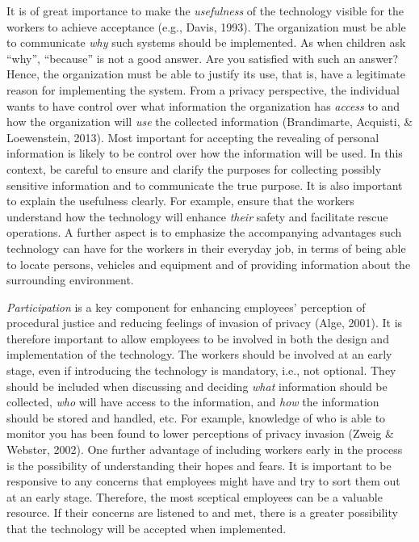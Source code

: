 \documentclass[
  12pt,
]{scrbook}
\begin{document}
It is of great importance to make the \emph{usefulness} of the technology visible for the workers to achieve acceptance (e.g., Davis, 1993). The organization must be able to communicate \emph{why} such systems should be implemented. As when children ask ``why'', ``because'' is not a good answer. Are you satisfied with such an answer? Hence, the organization must be able to justify its use, that is, have a legitimate reason for implementing the system. From a privacy perspective, the individual wants to have control over what information the organization has \emph{access} to and how the organization will \emph{use} the collected information (Brandimarte, Acquisti, \& Loewenstein, 2013). Most important for accepting the revealing of personal information is likely to be control over how the information will be used. In this context, be careful to ensure and clarify the purposes for collecting possibly sensitive information and to communicate the true purpose. It is also important to explain the usefulness clearly. For example, ensure that the workers understand how the technology will enhance \emph{their} safety and facilitate rescue operations. A further aspect is to emphasize the accompanying advantages such technology can have for the workers in their everyday job, in terms of being able to locate persons, vehicles and equipment and of providing information about the surrounding environment.~

\emph{Participation} is a key component for enhancing employees' perception of procedural justice and reducing feelings of invasion of privacy (Alge, 2001). It is therefore important to allow employees to be involved in both the design and implementation of the technology. The workers should be involved at an early stage, even if introducing the technology is mandatory, i.e., not optional. They should be included when discussing and deciding \emph{what} information should be collected, \emph{who} will have access to the information, and \emph{how} the information should be stored and handled, etc. For example, knowledge of who is able to monitor you has been found to lower perceptions of privacy invasion (Zweig \& Webster, 2002). One further advantage of including workers early in the process is the possibility of understanding their hopes and fears. It is important to be responsive to any concerns that employees might have and try to sort them out at an early stage. Therefore, the most sceptical employees can be a valuable resource. If their concerns are listened to and met, there is a greater possibility that the technology will be accepted when implemented.~
\end{document}
